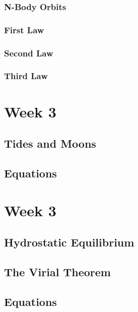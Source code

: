 \documentclass[a4paper,10pt]{article}
\begin{document}
\subsubsection{N-Body Orbits}
\subsubsection{First Law}
\subsubsection{Second Law}
\subsubsection{Third Law}


\newpage
\section{Week 3}

\subsection{Tides and Moons}

\subsection{Equations}


\newpage
\section{Week 3}

\subsection{Hydrostatic Equilibrium}

\subsection{The Virial Theorem}

\subsection{Equations}
\end{document}
